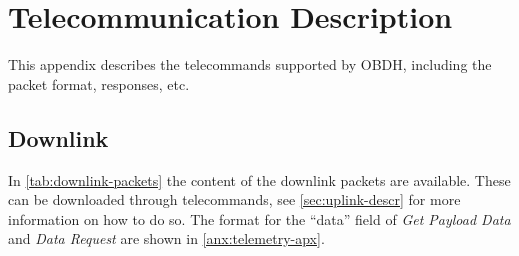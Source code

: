 %
%
%
%
%

%
%
%
%
%
%

\chapter{Telecommunication Description} \label{anx:packets}

This appendix describes the telecommands supported by OBDH, including the packet format, responses, etc.

\section{Downlink}

In \autoref{tab:downlink-packets} the content of the downlink packets are available. These can be downloaded through telecommands, see \autoref{sec:uplink-descr} for more information on how to do so. The format for the ``data'' field of \textit{Get Payload Data} and \textit{Data Request} are shown in \autoref{anx:telemetry-apx}.

